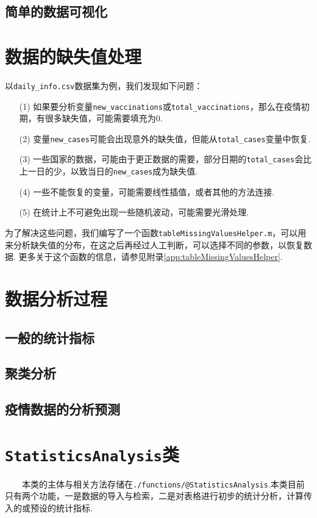 \documentclass[a4paper, titlepage]{article}
\begin{document}
        \subsection*{简单的数据可视化}
    \section{数据的缺失值处理}
        以\texttt{daily\_info.csv}数据集为例，我们发现如下问题：
        \begin{enumerate}
            \item [(1)] 如果要分析变量\texttt{new\_vaccinations}或\texttt{total\_vaccinations}，那么在疫情初期，有很多缺失值，可能需要填充为$0$.
            \item [(2)] 变量\texttt{new\_cases}可能会出现意外的缺失值，但能从\texttt{total\_cases}变量中恢复.
            \item [(3)] 一些国家的数据，可能由于更正数据的需要，部分日期的\texttt{total\_cases}会比上一日的少，以致当日的\texttt{new\_cases}成为缺失值.
            \item [(4)] 一些不能恢复的变量，可能需要线性插值，或者其他的方法连接.
            \item [(5)] 在统计上不可避免出现一些随机波动，可能需要光滑处理.
        \end{enumerate}
        为了解决这些问题，我们编写了一个函数\texttt{tableMissingValuesHelper.m}，可以用来分析缺失值的分布，在这之后再经过人工判断，可以选择不同的参数，以恢复数据. 更多关于这个函数的信息，请参见附录\ref{app:tableMissingValuesHelper}. 
    \section{数据分析过程}
    \subsection{一般的统计指标}\label{一般的统计指标}
    \subsection{聚类分析}
    \subsection{疫情数据的分析预测}
    \newpage
    \appendix
    \section{\texttt{StatisticsAnalysis}类}\label{app:StatisticsAnalysis}
    　　本类的主体与相关方法存储在\texttt{./functions/@StatisticsAnalysis}.本类目前只有两个功能，一是数据的导入与检索，二是对表格进行初步的统计分析，计算传入的或预设的统计指标. 
\end{document}
